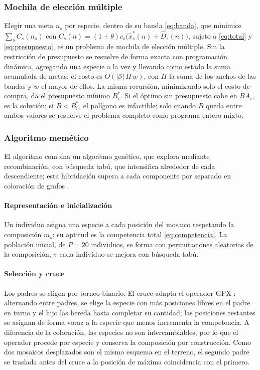 \subsubsection{Mochila de elección múltiple}
\label{subsec:mochila}

Elegir una meta $n_s$ por especie, dentro de su banda \eqref{eq:banda}, que minimice $\sum_sC_s(n_s)$ con $C_s(n)=(1+\theta)c_s\bigl(\hat{x}_s^{*}(n)+\hat{D}_s(n)\bigr)$, sujeto a \eqref{eq:total} y \eqref{eq:presupuesto}, es un problema de mochila de elección múltiple. Sin la restricción de presupuesto se resuelve de forma exacta con programación dinámica, agregando una especie a la vez y llevando como estado la suma acumulada de metas; el costo es $O(|\mathcal{S}|\,H\,w)$, con $H$ la suma de los anchos de las bandas y $w$ el mayor de ellos. La misma recursión, minimizando solo el costo de compra, da el presupuesto mínimo $B_i^{*}$. Si el óptimo sin presupuesto cabe en $BA_i$, es la solución; si $B<B_i^{*}$, el polígono es infactible; solo cuando $B$ queda entre ambos valores se resuelve el problema completo como programa entero mixto.

\subsubsection{Algoritmo memético}
\label{subsec:espacial-memetico}

El algoritmo combina un algoritmo genético, que explora mediante recombinación, con búsqueda tabú, que intensifica alrededor de cada descendiente; esta hibridación supera a cada componente por separado en coloración de grafos \autocite{galinier1999}.

\paragraph{Representación e inicialización} Un individuo asigna una especie a cada posición del mosaico respetando la composición $m_s$; su aptitud es la competencia total \eqref{eq:competencia}. La población inicial, de $P=20$ individuos, se forma con permutaciones aleatorias de la composición, y cada individuo se mejora con búsqueda tabú.

\paragraph{Selección y cruce} Los padres se eligen por torneo binario. El cruce adapta el operador GPX \autocite{galinier1999}: alternando entre padres, se elige la especie con más posiciones libres en el padre en turno y el hijo las hereda hasta completar su cantidad; las posiciones restantes se asignan de forma voraz a la especie que menos incrementa la competencia. A diferencia de la coloración, las especies no son intercambiables, por lo que el operador procede por especie y conserva la composición por construcción. Como dos mosaicos desplazados son el mismo esquema en el terreno, el segundo padre se traslada antes del cruce a la posición de máxima coincidencia con el primero.

